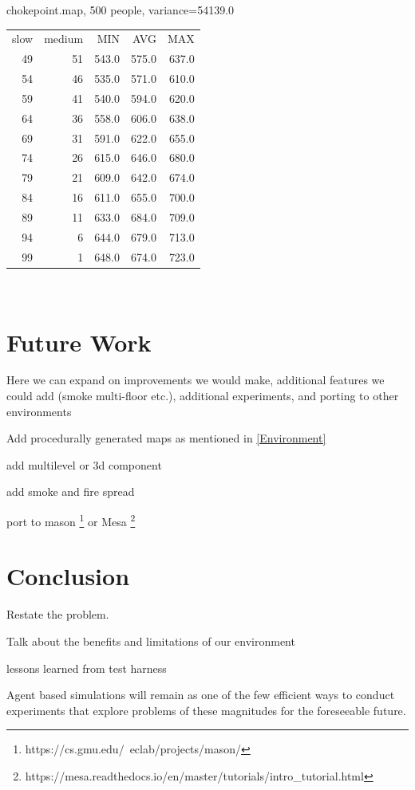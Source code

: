 \documentclass[12pt,letterpaper]{article}
\begin{document}
chokepoint.map, 500 people, variance=54139.0
\begin{tabular}{ r | r | r | r | r }
slow & medium & MIN   & AVG   & MAX \\
49 & 51 & 543.0 & 575.0 & 637.0 \\
54 & 46 & 535.0 & 571.0 & 610.0 \\
59 & 41 & 540.0 & 594.0 & 620.0 \\
64 & 36 & 558.0 & 606.0 & 638.0 \\
69 & 31 & 591.0 & 622.0 & 655.0 \\
74 & 26 & 615.0 & 646.0 & 680.0 \\
79 & 21 & 609.0 & 642.0 & 674.0 \\
84 & 16 & 611.0 & 655.0 & 700.0 \\
89 & 11 & 633.0 & 684.0 & 709.0 \\
94 &  6 & 644.0 & 679.0 & 713.0 \\
99 &  1 & 648.0 & 674.0 & 723.0 \\
\end{tabular}  
\\                                     
\section{Future Work}
Here we can expand on improvements we would make, additional features we could add (smoke multi-floor etc.), additional experiments, and porting to other environments

Add procedurally generated maps as mentioned in \ref{Environment}

add multilevel or 3d component

add smoke and fire spread

port to mason \footnote{https://cs.gmu.edu/~eclab/projects/mason/} or Mesa \footnote{https://mesa.readthedocs.io/en/master/tutorials/intro\_tutorial.html}

\section {Conclusion}

Restate the problem.

Talk about the benefits and limitations of our environment

lessons learned from test harness

Agent based simulations will remain as one of the few efficient ways to conduct experiments that explore problems of these magnitudes for the foreseeable future.





\end{document}
